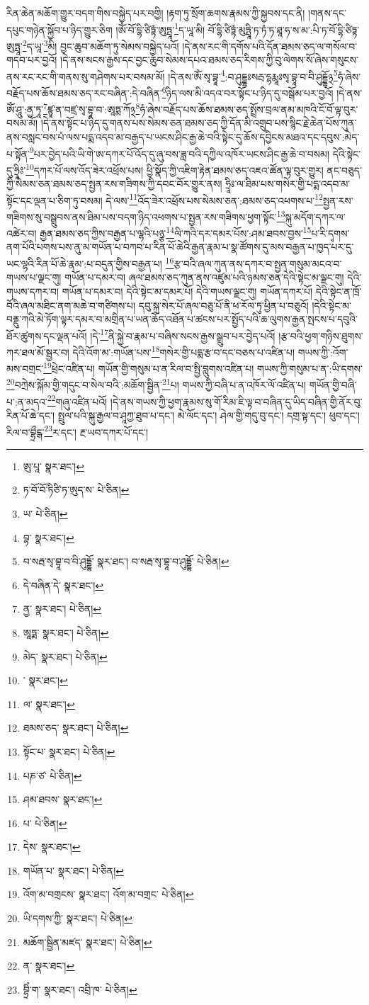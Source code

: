 རིན་ཆེན་མཆོག་གྱུར་བདག་གིས་བསྐྱེད་པར་བགྱི། །རྟག་ཏུ་སྲོག་ཆགས་རྣམས་ཀྱི་སྐྱབས་དང་ནི། །གནས་དང་དཔུང་གཉེན་སྐྱོབ་པ་ཉིད་གྱུར་ཅིག །ཨོཾ་བོ་དྷི་ཙིཏྟཾ་ཨུཏྤཱ་\footnote{ཨུ་པཱ་  སྣར་ཐང་། }ད་ཡཱ་མི། བོ་དྷི་ཙིཏྟཾ་མུཏྤཱི་ཏ་ཏཾ་ཏ་ཐཱ་ཧ་ས་མ་:པི་ཏ་བོ་དྷི་ཙིཏྟ་ཨུཏྤཱ་\footnote{ཏ་བོ་བོ་ཏིཙི་ཏ་ཨུད་ས་  པེ་ཅིན། }ད་ཡཱ་\footnote{ཡ་  པེ་ཅིན། }མི། བྱང་ཆུབ་མཆོག་ཏུ་སེམས་བསྐྱེད་པའོ། །དེ་ནས་རང་གི་དགོས་པའི་དོན་ཐམས་ཅད་ལ་གསོལ་བ་གདབ་པར་བྱའོ། །དེ་ནས་སངས་རྒྱས་དང་བྱང་ཆུབ་སེམས་དཔའ་ཐམས་ཅད་རིགས་ཀྱི་བུ་ལེགས་སོ་ཞེས་གསུངས་ནས་རང་རང་གི་གནས་སུ་གཤེགས་པར་བསམ་མོ། །དེ་ནས་ཨོཾ་སྭ་བྷཱ་\footnote{བྷ་  སྣར་ཐང་། }:བ་ཤུདྡྷཿསརྦ་དྷརྨཱཿསྭ་བྷཱ་བ་བི་ཤུདྡྷོ྅\footnote{བ་སརྦ་སྭ་བྷཱ་བ་བི་ཤུདྡྷོ་  སྣར་ཐང་། བ་སརྦ་སྭ་བྷཱ་བ་ཤུདྡྷོ་  པེ་ཅིན། }ཧཾ་ཞེས་བརྗོད་པས་ཆོས་ཐམས་ཅད་རང་བཞིན་:དེ་བཞིན་\footnote{དེ་བཞིན་དེ་  སྣར་ཐང་། }ཉིད་ལས་མི་འདའ་བར་སྟོང་པ་ཉིད་དུ་བསྒོམ་པར་བྱའོ། །དེ་ནས་ཨོཾ་ཤཱུ་:ནྱ་ཏཱ་\footnote{ནྱ་  སྣར་ཐང་།  པེ་ཅིན། }ཛྙཱ་ན་བཛྲ་སྭ་བྷཱ་བ་:ཨཱཏྨ་ཀོ྅\footnote{ཨཱཏྨ་  སྣར་ཐང་།  པེ་ཅིན། }ཧཾ་ཞེས་བརྗོད་པས་ཆོས་ཐམས་ཅད་སྤྲོས་བྲལ་ནམ་མཁའི་ངོ་བོ་ལྟ་བུར་བསམ་མོ། །དེ་ནས་སྟོང་པ་ཉིད་དུ་གནས་པས་སེམས་ཅན་ཐམས་ཅད་ཀྱི་དོན་མི་འགྲུབ་པས་སྙིང་རྗེ་ཆེན་པོས་ཀུན་ནས་བསླང་བས་པཾ་ལས་པདྨ་འདབ་མ་བརྒྱད་པ་ཡངས་ཤིང་རྒྱ་ཆེ་བའི་སྟེང་དུ་ཆོས་དབྱིངས་མཐའ་དང་དབུས་:མེད་པ་སྟོན་\footnote{མེད་  སྣར་ཐང་།  པེ་ཅིན། }པར་བྱེད་པའི་ཡི་གེ་ཨ་དཀར་པོ་འོད་དུ་ཞུ་བས་ཟླ་བའི་དཀྱིལ་འཁོར་ཡངས་ཤིང་རྒྱ་ཆེ་བ་བསམ། དེའི་སྟེང་དུ་ཧྲཱིཿ་\footnote{་  སྣར་ཐང་། }དཀར་པོ་ལས་འོད་ཟེར་འཕྲོས་པས། ཕྱི་སྣོད་ཀྱི་འཇིག་རྟེན་ཐམས་ཅད་འཇའ་ཚོན་ལྟ་བུར་གྱུར། ནང་བཅུད་ཀྱི་སེམས་ཅན་ཐམས་ཅད་སྤྱན་རས་གཟིགས་ཀྱི་དབང་བོར་གྱུར་ནས། ཧྲཱིཿ་ལ་ཐིམ་པས་གསེར་གྱི་པདྨ་འདབ་མ་སྟོང་དང་ལྡན་པ་ཅིག་ཏུ་བསམ། དེ་ལས་\footnote{ལ་  སྣར་ཐང་། }འོད་ཟེར་འཕྲོས་པས་སེམས་ཅན་:ཐམས་ཅད་འཕགས་པ་\footnote{ཐམས་ཅད་  སྣར་ཐང་།  པེ་ཅིན། }སྤྱན་རས་གཟིགས་སུ་བསྒྲུབས་ནས་ཐིམ་པས་བདག་ཉིད་འཕགས་པ་སྤྱན་རས་གཟིགས་ཕྱག་སྟོང་\footnote{སྟོང་པ་  སྣར་ཐང་།  པེ་ཅིན། }སྐུ་མདོག་དཀར་ལ་འཚེར་བ། རྒྱན་ཐམས་ཅད་ཀྱིས་བརྒྱན་པ་ལྷའི་པཉྩ་\footnote{པཎ་ཙ་  པེ་ཅིན། }ལི་ཀའི་དར་དམར་པོས་:ཤམ་ཐབས་བྱས་\footnote{ཤམ་ཐབས་  སྣར་ཐང་། }པ་རི་དྭགས་ནག་པོའི་པགས་པས་ནུ་མ་གཡོན་པ་བཀབ་པ་རིན་པོ་ཆེའི་རྒྱན་རྣམ་པ་སྣ་ཚོགས་དུ་མས་བརྒྱན་པ་ཁྱད་པར་དུ་ཡང་ལྷའི་རིན་པོ་ཆེ་རྣམ་:པ་བདུན་གྱིས་བརྒྱན་པ། \footnote{པ་  པེ་ཅིན། }རྩ་བའི་ཞལ་ཀུན་ནས་དཀར་བ་སྤྱན་གསུམ་མངའ་བ་གཡས་པ་ལྗང་གུ། གཡོན་པ་དམར་བ། ཞལ་ཐམས་ཅད་ཀུན་ནས་འཛུམ་པའི་ཉམས་ཅན་དེའི་སྟེང་མ་ལྗང་གུ། དེའི་གཡས་དཀར་བ། གཡོན་པ་དམར་བ། དེའི་སྟེང་མ་དམར་པོ། དེའི་གཡས་ལྗང་གུ། གཡོན་དཀར་པོ། དེའི་སྟེང་ན་ཁྲོ་བོའི་ཞལ་མཐིང་ནག་མཆེ་བ་གཙིགས་པ། དབུ་སྐྲ་སེར་པོ་ཞལ་བཅུ་པོ་ནི་ཕ་རོལ་ཏུ་ཕྱིན་པ་བཅུའོ། །དེའི་སྟེང་མ་བནྡུ་ཀའི་མེ་ཏོག་ལྟར་དམར་བ་མགྲིན་པ་ཡན་ཆོད་འཐོན་པ་ཚངས་པར་སྤྱོད་པའི་ཆ་ལུགས་རྒྱན་སྤངས་པ་དབུའི་ཐོར་ཚུགས་དང་ལྡན་པའོ། །དེ་\footnote{དེས་  སྣར་ཐང་། }ནི་སྐྱེ་བ་རྣམ་པ་བཞིས་སངས་རྒྱས་སྒྲུབ་པར་བྱེད་པའོ། །རྩ་བའི་ཕྱག་གཉིས་ཐུགས་ཀར་ཐལ་མོ་སྦྱར་བ། དེའི་འོག་མ་:གཡོན་པས་\footnote{གཡོན་པ་  སྣར་ཐང་།  པེ་ཅིན། }གསེར་གྱི་པདྨ་རྩ་བ་དང་བཅས་པ་འཛིན་པ། གཡས་ཀྱི་:འོག་མས་བགྲང་\footnote{འོག་མ་བགྲངས་  སྣར་ཐང་། འོག་མ་བགྲང་  པེ་ཅིན། }ཕྲེང་འཛིན་པ། གཡོན་གྱི་གསུམ་པ་ན་རིལ་བ་སྤྱི་བླུགས་འཛིན་པ། གཡས་ཀྱི་གསུམ་པ་ན་:ཡི་དགས་\footnote{ཡི་དགས་ཀྱི་  སྣར་ཐང་།  པེ་ཅིན། }བཀྲེས་སྐོམ་གྱི་གདུང་བ་སེལ་བའི་:མཆོག་སྦྱིན་\footnote{མཆོག་སྦྱིན་མཛད་  སྣར་ཐང་།  པེ་ཅིན། }པ། གཡས་ཀྱི་བཞི་པ་ན་འཁོར་ལོ་འཛིན་པ། གཡོན་གྱི་བཞི་པ་:ན་མདའ་\footnote{ན་  སྣར་ཐང་། }གཞུ་འཛིན་པའོ། །དེ་ནས་གཡས་ཀྱི་ཕྱག་རྣམས་སུ་གོ་རིམ་ཇི་ལྟ་བ་བཞིན་དུ་ཡིད་བཞིན་གྱི་ནོར་བུ་རིན་པོ་ཆེ་དང་། སྤྲུལ་པའི་སྐུ་རྒྱལ་བ་ཤཱཀྱ་ཐུབ་པ་དང་། མེ་ལོང་དང་། ཤེལ་གྱི་གདུ་བུ་དང་། དགྲ་སྟ་དང་། ཕུབ་དང་། རིལ་བ་བྷྲྀངྒ་\footnote{བྷྲིཾ་ག་  སྣར་ཐང་། འབྲི་ཁ་  པེ་ཅིན། }ར་དང་། རྔ་ཡབ་དཀར་པོ་དང་། 
